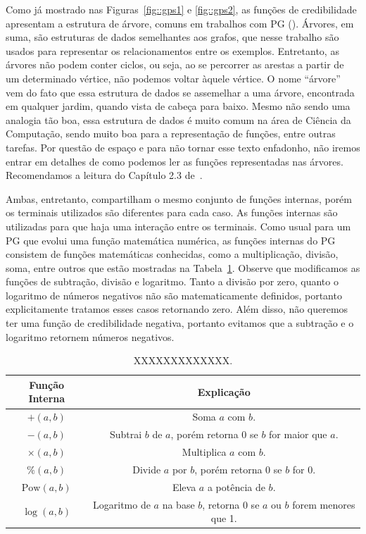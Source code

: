 Como já mostrado nas Figuras~\ref{fig::gps1} e \ref{fig::gps2}, as funções de credibilidade apresentam a estrutura de árvore, comuns em trabalhos com \textsc{PG} (\cite{Koza92}). 
Árvores, em suma, são estruturas de dados semelhantes aos grafos, que nesse trabalho são usados para representar os relacionamentos entre os exemplos.
Entretanto, as árvores não podem conter ciclos, ou seja, ao se percorrer as arestas a partir de um determinado vértice, não podemos voltar àquele vértice.
O nome ``árvore'' vem do fato que essa estrutura de dados se assemelhar a uma árvore, encontrada em qualquer jardim, quando vista de cabeça para baixo. 
Mesmo não sendo uma analogia tão boa, essa estrutura de dados é muito comum na área de Ciência da Computação, sendo muito boa para a representação de funções, entre outras tarefas.
Por questão de espaço e para não tornar esse texto enfadonho, não iremos entrar em detalhes de como podemos ler as funções representadas nas árvores. Recomendamos a leitura do Capítulo 2.3 de~\cite{Knuth97}.


Ambas, entretanto, compartilham o mesmo conjunto de funções internas, porém os terminais utilizados são diferentes para cada caso. As funções internas são utilizadas para que haja uma interação entre os terminais.
Como usual para um \textsc{PG} que evolui uma função matemática numérica, as funções internas do \textsc{PG} consistem de funções matemáticas conhecidas, como a multiplicação, divisão, soma, entre outros que estão mostradas na Tabela~\ref{table::funcoespg}. 
Observe que modificamos as funções de subtração, divisão e logaritmo.
Tanto a divisão por zero, quanto o logaritmo de números negativos não são matematicamente definidos, portanto explicitamente tratamos esses casos retornando zero. Além disso, não queremos ter uma função de credibilidade negativa, portanto evitamos que a subtração e o logaritmo retornem números negativos.

\begin{table}[ht*]
\centering
\begin{tabular}{|c|c|}
\toprule
    \textbf{Função Interna} & \textbf{Explicação} \\
\midrule
    $+(a,b)$           & Soma $a$ com $b$. \tabularnewline \hline
    $-(a,b)$           & Subtrai $b$ de $a$, porém retorna 0 se $b$ for maior que $a$.\tabularnewline \hline
    $\times(a,b) $     & Multiplica $a$ com $b$. \tabularnewline \hline
    $\%(a,b)$          & Divide $a$ por $b$, porém retorna 0 se $b$ for 0. \tabularnewline \hline
    $\text{Pow}(a,b)$  & Eleva $a$ a potência de $b$. \tabularnewline \hline 
    $\log(a,b) $       & Logaritmo de $a$ na base $b$, retorna 0 se $a$ ou $b$ forem menores que 1. \tabularnewline
\bottomrule
\end{tabular}
\caption{XXXXXXXXXXXXX.}
\label{table::funcoespg}
\end{table}

